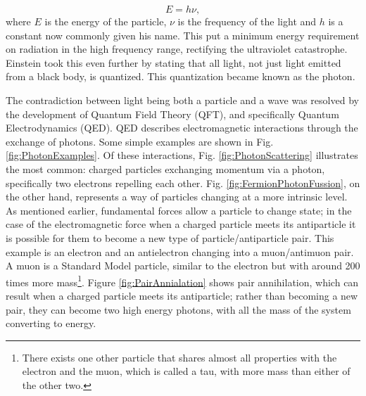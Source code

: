 \begin{equation}\label{eq:PhotonEnergy}
    E
    =
    h\nu,
\end{equation}
where $E$ is the energy of the particle, $\nu$ is the frequency of the light and $h$ is a constant now commonly given his name\cite{ANDP:ANDP19013090310}. This put a minimum energy requirement on radiation in the high frequency range, rectifying the ultraviolet catastrophe. Einstein took this even further by stating that all light, not just light emitted from a black body, is quantized. This quantization became known as the photon. \par
	The contradiction between light being both a particle and a wave was resolved by the development of Quantum Field Theory (QFT), and specifically Quantum Electrodynamics (QED). QED describes electromagnetic interactions through the exchange of photons. Some simple examples are shown in Fig. \ref{fig:PhotonExamples}. Of these interactions,  Fig. \ref{fig:PhotonScattering} illustrates the most common: charged particles exchanging momentum via a photon, specifically two electrons repelling each other. Fig. \ref{fig:FermionPhotonFussion}, on the other hand, represents a way of particles changing at a more intrinsic level. As mentioned earlier, fundamental forces allow a particle to change state;  in the case of the electromagnetic force when a charged particle meets its antiparticle it is possible for them to become a new type of particle/antiparticle pair. This example is an electron and an antielectron changing into a muon/antimuon pair. A muon is a Standard Model particle, similar to the electron but with around 200 times more mass\footnote{There exists one other particle that shares almost all properties with the electron and the muon, which is called a tau, with more mass than either of the other two.}.  Figure \ref{fig:PairAnnialation} shows pair annihilation, which can result when a charged particle meets its antiparticle; rather than becoming a new pair, they can become two high energy photons, with all the mass of the system converting to energy. 


